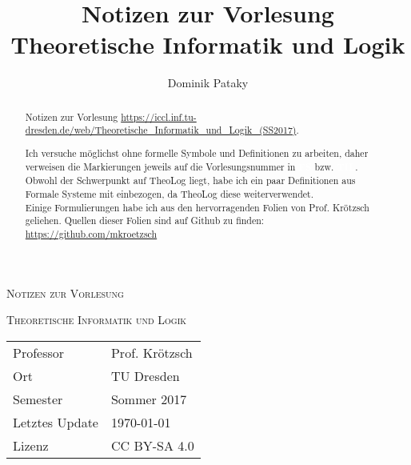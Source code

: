 \documentclass[a4paper,10pt]{article}
\title{Notizen zur Vorlesung Theoretische Informatik und Logik}
\author{Dominik Pataky}
\newcommand{\vl}[1]{\colorbox{light-gray}{\textcolor{white}{\textbf{#1}}}}
\begin{document}
    \pagestyle{fancy}

    \rhead{\slshape\nouppercase{\leftmark}}
    \cfoot{\thepage}

    \begin{titlepage}
        \centering

        {\scshape\Large Notizen zur Vorlesung \par}
        {\scshape\LARGE Theoretische Informatik und Logik \par}
        \vspace{1cm}

        \begin{abstract}
            Notizen zur Vorlesung \url{https://iccl.inf.tu-dresden.de/web/Theoretische_Informatik_und_Logik_(SS2017)}. \par
            Ich versuche möglichst ohne formelle Symbole und Definitionen zu arbeiten, daher verweisen die Markierungen jeweils auf die Vorlesungsnummer in \vl{FS} bzw. \vl{TIL}.
            Obwohl der Schwerpunkt auf TheoLog liegt, habe ich ein paar Definitionen aus Formale Systeme mit einbezogen, da TheoLog diese weiterverwendet. \\
            Einige Formulierungen habe ich aus den hervorragenden Folien von Prof. Krötzsch geliehen. Quellen dieser Folien sind auf Github zu finden: \url{https://github.com/mkroetzsch}
        \end{abstract}

        \tableofcontents

        \vfill
        \begin{tabular}{p{3cm} p{10cm}}
            Professor & Prof. Krötzsch \\
            Ort & TU Dresden \\
            Semester & Sommer 2017 \\
            Letztes Update & \today \\
            Lizenz & CC BY-SA 4.0
        \end{tabular}

    \end{titlepage}

\end{document}
